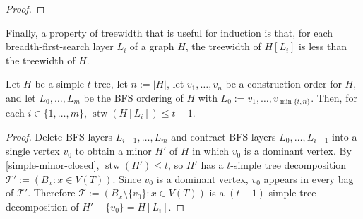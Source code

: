 \documentclass[kpfonts]{patmorin}
\DeclareMathOperator{\stw}{stw}
\theoremstyle{named}
\begin{document}
\begin{proof}
\end{proof}

Finally, a property of treewidth that is useful for induction \cite{kundgen.pelsmajer:nonrepetitive,bose.dujmovic.ea:asymptotically} is that, for each breadth-first-search layer $L_i$ of a graph $H$, the treewidth of $H[L_i]$ is less than the treewidth of $H$.

\begin{lem}\label{simple-bfs-layers}
    Let $H$ be a simple $t$-tree, let $n:=|H|$, let $v_1,\ldots,v_n$ be a construction order for $H$, and let $L_0,\ldots,L_m$ be the BFS ordering of $H$ with $L_0:=v_1,\ldots,v_{\min\{t,n\}}$.   Then, for each $i\in\{1,\ldots,m\}$, $\stw(H[L_i])\le t-1$.
\end{lem}

\begin{proof}
    Delete BFS layers $L_{i+1},\ldots,L_m$ and contract BFS layers $L_0,\ldots,L_{i-1}$ into a single vertex $v_0$ to obtain a minor $H'$ of $H$ in which $v_0$ is a dominant vertex.  By \cref{simple-minor-closed}, $\stw(H')\le t$, so $H'$ has a $t$-simple tree decomposition $\mathcal{T}':=(B_x:x\in V(T))$.  Since $v_0$ is a dominant vertex, $v_0$ appears in every bag of $\mathcal{T}'$.  Therefore $\mathcal{T}:=(B_x\setminus\{v_0\}:x\in V(T))$ is a $(t-1)$-simple tree decomposition of $H'-\{v_0\}=H[L_i]$.
\end{proof}




\end{document}
